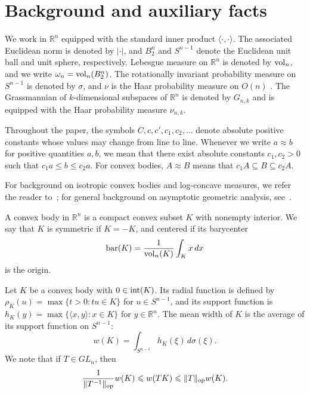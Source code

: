 \documentclass[11pt,leqno]{article}
\theoremstyle{definition}
\numberwithin{equation}{section}
\newcommand{\ls}{\leqslant}
\begin{document}
\section{Background and auxiliary facts}\label{section:2}

We work in $\mathbb{R}^n$ equipped with the standard inner product $\langle \cdot, \cdot \rangle$.  
The associated Euclidean norm is denoted by $|\cdot|$, and $B_2^n$ and $S^{n-1}$ denote the Euclidean unit ball and unit sphere, respectively.  
Lebesgue measure on $\mathbb{R}^n$ is denoted by ${\rm vol}_n$, and we write $\omega_n = {\rm vol}_n(B_2^n)$.
The rotationally invariant probability measure on $S^{n-1}$ is denoted by $\sigma$, and $\nu$ is the Haar probability measure on $O(n)$ . 
The Grassmannian of $k$-dimensional subspaces of ${\mathbb{R}}^n$ is denoted by $G_{n,k}$ and is equipped with the Haar probability measure $\nu_{n,k}$. 

Throughout the paper, the symbols $C, c, c', c_1, c_2, \ldots$ denote absolute positive constants whose values may change from line to line.  
Whenever we write $a \approx b$ for positive quantities $a,b$, we mean that there exist absolute constants $c_1, c_2 > 0$ such that $c_1 a \ls b \ls c_2 a$. 
For convex bodies, $A\approx B$ means that $c_1A\subseteq B\subseteq c_2A$.

For background on isotropic convex bodies and log-concave measures, we refer the reader to~\cite{BGVV-book};  
for general background on asymptotic geometric analysis, see~\cite{AGA-book, AGA-book-2}.

\medskip

A {convex body} in $\mathbb{R}^n$ is a compact convex subset $K$ with nonempty interior.  
We say that $K$ is {symmetric} if $K = -K$, and {centered} if its barycenter
\[{\rm bar}(K)=\frac{1}{{\rm vol}_n(K)}\int_K x\,dx\] is the origin.

Let $K$ be a convex body with $0 \in {\rm int}(K)$. Its radial function is defined by 
$\rho_K(u) = \max\{ t > 0 : tu \in K \}$ for $u \in S^{n-1}$, 
and its {support function} is
$h_K(y) = \max \{ \langle x, y \rangle : x \in K \}$ for $y\in\mathbb{R}^n$. The mean width of $K$ is the average of its support function on $S^{n-1}$:
\[w(K)=\int_{S^{n-1}}h_K(\xi)\,d\sigma(\xi).\]
We note that if $T \in GL_n$, then
\[\frac{1}{\|T^{-1}\|_{{\rm op}}} w(K) \ls w(TK) \ls \|T\|_{{\rm op}} w(K).\]
\end{document}
